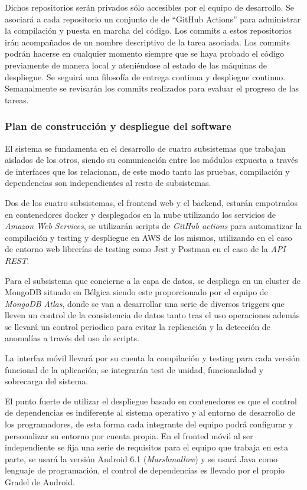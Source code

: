 \documentclass{article}
\begin{document}
Dichos repositorios serán privados sólo accesibles por el equipo de desarrollo.
Se asociará a cada repositorio un conjunto de de “GitHub Actions” para administrar la compilación y puesta en marcha del código.
Los commits a estos repositorios irán acompañados de un nombre descriptivo de la tarea asociada.
Los commits podrán hacerse en cualquier momento siempre que se haya probado el código previamente de manera local y ateniéndose al estado de las máquinas de despliegue.
Se seguirá una filosofía de entrega continua y despliegue continuo.
Semanalmente se revisarán los commits realizados para evaluar el progreso de las tareas.


\subsubsection{Plan de construcción y despliegue del software}

El sistema se fundamenta en el desarrollo de cuatro subsistemas que trabajan aislados de los otros, siendo su comunicación entre los módulos expuesta a través de interfaces que los relacionan, de este modo tanto las pruebas, compilación y dependencias son independientes al resto de subsistemas. 

Dos de los cuatro subsistemas, el frontend web y el backend, estarán empotrados en contenedores docker y desplegados en la nube utilizando los servicios de \textit{Amazon Web Services}, se utilizarán scripts de \textit{GitHub actions} para automatizar la compilación y testing y despliegue en AWS de los mismos, utilizando en el caso de entorno web librerías de testing como Jest y Postman en el caso de la \textit{API REST}. 

Para el subsistema que concierne a la capa de datos, se despliega en un cluster de MongoDB situado en Bélgica siendo este proporcionado por el equipo de \textit{MongoDB Atlas}, donde se van a desarrollar una serie de diversos triggers que lleven un control de la consistencia de datos tanto tras el uso operaciones además se llevará un control periodico para evitar la replicación y la detección de anomalías a través del uso de scripts.

La interfaz móvil llevará por su cuenta la compilación y testing para cada versión funcional de la aplicación, se integrarán test de unidad, funcionalidad y sobrecarga del sistema.

El punto fuerte de utilizar el despliegue basado en contenedores es que el control de dependencias es indiferente al sistema operativo y al entorno de desarrollo de los programadores, de esta forma cada integrante del equipo podrá configurar y personalizar su entorno por cuenta propia. En el fronted móvil al ser independiente se fija una serie de requisitos para el equipo que trabaja en esta parte, se usará la versión Android 6.1 (\textit{Marshmallow}) y se usará Java como lenguaje de programación, el control de dependencias es llevado por el propio Gradel de Android.
\end{document}
